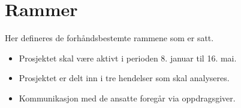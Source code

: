 \section{Rammer}
\label{sec:rammer}
Her defineres de forhåndsbestemte rammene som er satt. 

\begin{itemize}
    \item Prosjektet skal være aktivt i perioden 8. januar til 16. mai.
    \item Prosjektet er delt inn i tre hendelser som skal analyseres.
    \item Kommunikasjon med de ansatte foregår via oppdragsgiver.
\end{itemize}